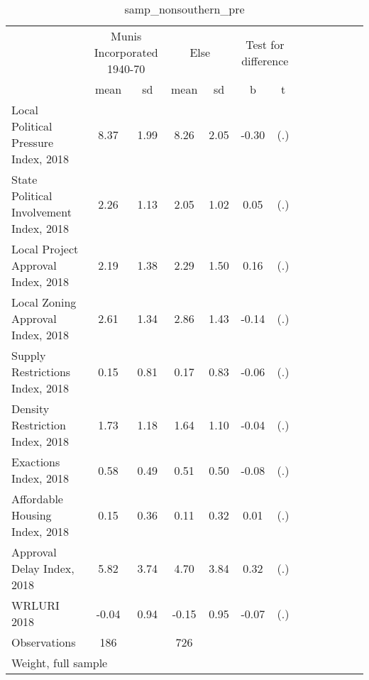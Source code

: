\begin{table}[htbp]\centering
\def\sym#1{\ifmmode^{#1}\else\(^{#1}\)\fi}
\caption{samp\_nonsouthern\_pre \label{tab1}}
\begin{tabular}{l*{3}{cccc}}
\toprule
                    &\multicolumn{2}{c}{Munis Incorporated 1940-70}&\multicolumn{2}{c}{Else} &\multicolumn{2}{c}{Test for difference}\\
                    &        mean&          sd&        mean&          sd&           b         &           t\\
\midrule
Local Political Pressure Index, 2018&        8.37&        1.99&        8.26&        2.05&       -0.30         &         (.)\\
State Political Involvement Index, 2018&        2.26&        1.13&        2.05&        1.02&        0.05         &         (.)\\
Local Project Approval Index, 2018&        2.19&        1.38&        2.29&        1.50&        0.16         &         (.)\\
Local Zoning Approval Index, 2018&        2.61&        1.34&        2.86&        1.43&       -0.14         &         (.)\\
Supply Restrictions Index, 2018&        0.15&        0.81&        0.17&        0.83&       -0.06         &         (.)\\
Density Restriction Index, 2018&        1.73&        1.18&        1.64&        1.10&       -0.04         &         (.)\\
Exactions Index, 2018&        0.58&        0.49&        0.51&        0.50&       -0.08         &         (.)\\
Affordable Housing Index, 2018&        0.15&        0.36&        0.11&        0.32&        0.01         &         (.)\\
Approval Delay Index, 2018&        5.82&        3.74&        4.70&        3.84&        0.32         &         (.)\\
WRLURI 2018         &       -0.04&        0.94&       -0.15&        0.95&       -0.07         &         (.)\\
\midrule
Observations        &         186&            &         726&            &                     &            \\
\bottomrule
\multicolumn{7}{l}{\footnotesize Weight, full sample}\\
\end{tabular}
\end{table}
